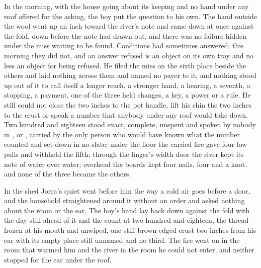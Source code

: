 In the morning, with the house going about its keeping and no hand under any roof offered for the asking, the boy put the question to his own. The hand outside the wool went up an inch toward the river's note and came down at once against the fold, down before the note had drawn out, and there was no failure hidden under the miss waiting to be found. Conditions had sometimes answered; this morning they did not, and an answer refused is an object on its own tray and no less an object for being refused. He filed the miss on the sixth place beside the others and laid nothing across them and named no payer to it, and nothing stood up out of it to call itself a longer reach, a stronger hand, a hearing, a seventh, a stopping, a payment, one of the three held changes, a key, a power or a rule. He still could not close the two inches to the pot handle, lift his chin the two inches to the crust or speak a number that anybody under any roof would take down. Two hundred and eighteen stood exact, complete, unspent and spoken by nobody in ,  or , carried by the only person who would have known what the number counted and set down in no slate; under the floor the carried fire gave four low pulls and withheld the fifth; through the finger's-width door the river kept its note of water over water; overhead the boards kept four nails, four and a knot, and none of the three became the others.

In the shed Jorra's quiet went before him the way a cold air goes before a door, and the household straightened around it without an order and asked nothing about the room or the ear. The boy's hand lay back down against the fold with the day still ahead of it and the count at two hundred and eighteen, the thread frozen at his mouth and unwiped, one stiff brown-edged crust two inches from his ear with its empty place still unnamed and no third. The fire went on in the room that warmed him and the river in the room he could not enter, and neither stopped for the ear under the roof.
